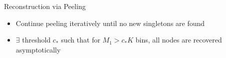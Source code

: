 \documentclass[final]{beamer}
\newlength{\twocolwid}
\newlength{\paraskip}
\begin{document}
\begin{frame}
\begin{columns}[t]
\begin{column}{\twocolwid}
\begin{block}{\Large Reconstruction via Peeling}
       \begin{figure}
	       \centering
	       \begin{subfigure}{.5\textwidth}
			  \centering
   			\scalebox{1.1}{}
		   \end{subfigure}%
		  \begin{subfigure}{.5	\textwidth}
		  \centering
		  \scalebox{1.1}{}
			\end{subfigure}	
		\end{figure}
\vspace{\paraskip}	 
	 \begin{itemize}
	   \item Continue peeling iteratively until no new singletons are found
	   \item $\exists$ threshold $c_*$ such that for $M_1>c_*K$ bins, all nodes are recovered asymptotically
    \end{itemize}
    \end{block}  
 \end{column}


\end{columns}
\end{frame}
\end{document}
